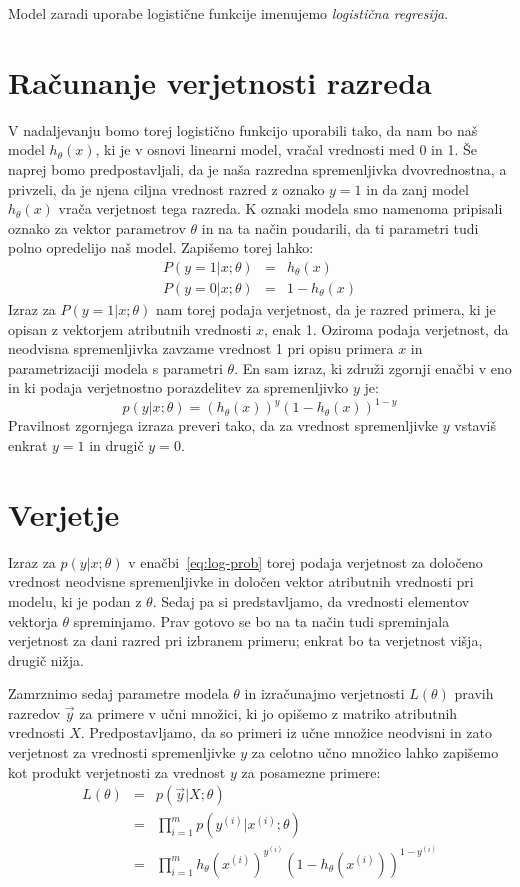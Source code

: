 Model zaradi uporabe logistične funkcije imenujemo {\em logistična regresija}.

\section{Računanje verjetnosti razreda}

V nadaljevanju bomo torej logistično funkcijo uporabili tako, da nam bo naš model $h_{\theta}(x)$, ki je v osnovi linearni model, vračal vrednosti med 0 in 1. Še naprej bomo predpostavljali, da je naša razredna spremenljivka dvovrednostna, a privzeli, da je njena ciljna vrednost razred z oznako $y=1$ in da zanj model $h_{\theta}(x)$ vrača verjetnost tega razreda. K oznaki modela smo namenoma pripisali oznako za vektor parametrov $\theta$ in na ta način poudarili, da ti parametri tudi polno opredelijo naš model. Zapišemo torej lahko:
\begin{eqnarray}
  P(y=1|x;\theta) & = & h_\theta(x) \\
  P(y=0|x;\theta) & = & 1-h_\theta(x)
\end{eqnarray}
Izraz za $P(y=1|x;\theta)$ nam torej podaja verjetnost, da je razred primera, ki je opisan z vektorjem atributnih vrednosti $x$, enak 1. Oziroma podaja verjetnost, da neodvisna spremenljivka zavzame vrednost 1 pri opisu primera $x$ in parametrizaciji modela s parametri $\theta$. En sam izraz, ki združi zgornji enačbi v eno in ki podaja verjetnostno porazdelitev za spremenljivko $y$ je:
\begin{equation}
  p(y|x;\theta) = (h_\theta(x))^y(1-h_\theta(x))^{1-y}
\label{eq:log-prob}
\end{equation}
Pravilnost zgornjega izraza preveri tako, da za vrednost spremenljivke $y$ vstaviš enkrat $y=1$ in drugič $y=0$.

\section{Verjetje}

Izraz za $p(y|x;\theta)$ v enačbi~\ref{eq:log-prob} torej podaja verjetnost za določeno vrednost neodvisne spremenljivke in določen vektor atributnih vrednosti pri modelu, ki je podan z $\theta$. Sedaj pa si predstavljamo, da vrednosti elementov vektorja $\theta$ spreminjamo. Prav gotovo se bo na ta način tudi spreminjala verjetnost za dani razred pri izbranem primeru; enkrat bo ta verjetnost višja, drugič nižja.

Zamrznimo sedaj parametre modela $\theta$ in izračunajmo verjetnosti $L(\theta)$ pravih razredov $\vec{y}$ za primere v učni množici, ki jo opišemo z matriko atributnih vrednosti $X$. Predpostavljamo, da so primeri iz učne množice neodvisni in zato verjetnost za vrednosti spremenljivke $y$ za celotno učno množico lahko zapišemo kot produkt verjetnosti za vrednost $y$ za posamezne primere:
\begin{eqnarray}
  L(\theta) & = & p(\vec{y}|X;\theta) \nonumber\\
  & = & \prod_{i=1}^m p(y^{(i)}|x^{(i)};\theta) \nonumber\\
  & = & \prod_{i=1}^m h_\theta(x^{(i)})^{y^{(i)}}(1-h_\theta(x^{(i)}))^{1-y^{(i)}}
\end{eqnarray}

